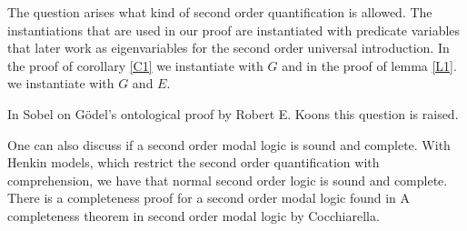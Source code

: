 \documentclass{article}
\begin{document}
The question arises what kind of second order quantification is allowed. The instantiations that are used in our proof are instantiated with predicate variables that later work as eigenvariables for the second order universal introduction. In the proof of corollary \ref{C1} we instantiate with $G$ and in the proof of lemma \ref{L1}.  we instantiate with $G$ and $E$. 

In Sobel on G\"{o}del's ontological proof by Robert E. Koons this question is raised. 

One can also discuss if a second order modal logic is sound and complete. With Henkin models, which restrict the second order quantification with comprehension, we have that normal second order logic is sound and complete. There is a completeness proof for a second order modal logic found in A completeness theorem in second order modal logic by Cocchiarella. 
\end{document}
